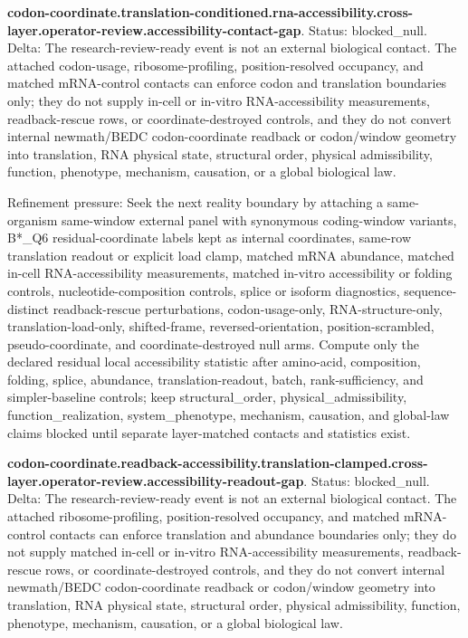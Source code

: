 \textbf{codon-coordinate.translation-conditioned.rna-accessibility.cross-layer.operator-review.accessibility-contact-gap}. Status: blocked\_null. Delta: The research-review-ready event is not an external biological contact. The attached codon-usage, ribosome-profiling, position-resolved occupancy, and matched mRNA-control contacts can enforce codon and translation boundaries only; they do not supply in-cell or in-vitro RNA-accessibility measurements, readback-rescue rows, or coordinate-destroyed controls, and they do not convert internal newmath/BEDC codon-coordinate readback or codon/window geometry into translation, RNA physical state, structural order, physical admissibility, function, phenotype, mechanism, causation, or a global biological law.

Refinement pressure: Seek the next reality boundary by attaching a same-organism same-window external panel with synonymous coding-window variants, B*\_Q6 residual-coordinate labels kept as internal coordinates, same-row translation readout or explicit load clamp, matched mRNA abundance, matched in-cell RNA-accessibility measurements, matched in-vitro accessibility or folding controls, nucleotide-composition controls, splice or isoform diagnostics, sequence-distinct readback-rescue perturbations, codon-usage-only, RNA-structure-only, translation-load-only, shifted-frame, reversed-orientation, position-scrambled, pseudo-coordinate, and coordinate-destroyed null arms. Compute only the declared residual local accessibility statistic after amino-acid, composition, folding, splice, abundance, translation-readout, batch, rank-sufficiency, and simpler-baseline controls; keep structural\_order, physical\_admissibility, function\_realization, system\_phenotype, mechanism, causation, and global-law claims blocked until separate layer-matched contacts and statistics exist.

\textbf{codon-coordinate.readback-accessibility.translation-clamped.cross-layer.operator-review.accessibility-readout-gap}. Status: blocked\_null. Delta: The research-review-ready event is not an external biological contact. The attached ribosome-profiling, position-resolved occupancy, and matched mRNA-control contacts can enforce translation and abundance boundaries only; they do not supply matched in-cell or in-vitro RNA-accessibility measurements, readback-rescue rows, or coordinate-destroyed controls, and they do not convert internal newmath/BEDC codon-coordinate readback or codon/window geometry into translation, RNA physical state, structural order, physical admissibility, function, phenotype, mechanism, causation, or a global biological law.

